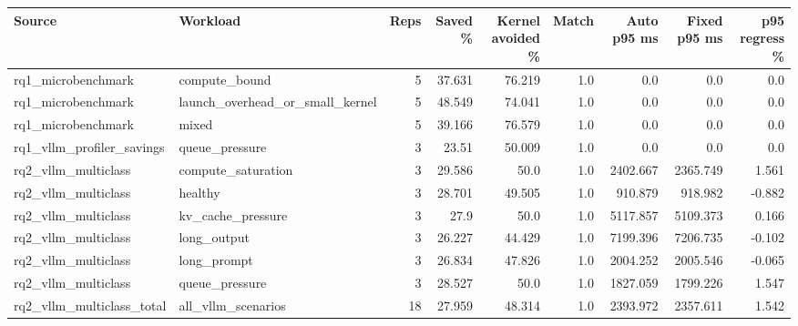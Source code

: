 \begin{tabular}{llrrrrrrr}
\hline
Source & Workload & Reps & Saved \% & Kernel avoided \% & Match & Auto p95 ms & Fixed p95 ms & p95 regress \% \\
\hline
rq1_microbenchmark & compute_bound & 5 & 37.631 & 76.219 & 1.0 & 0.0 & 0.0 & 0.0 \\
rq1_microbenchmark & launch_overhead_or_small_kernel & 5 & 48.549 & 74.041 & 1.0 & 0.0 & 0.0 & 0.0 \\
rq1_microbenchmark & mixed & 5 & 39.166 & 76.579 & 1.0 & 0.0 & 0.0 & 0.0 \\
rq1_vllm_profiler_savings & queue_pressure & 3 & 23.51 & 50.009 & 1.0 & 0.0 & 0.0 & 0.0 \\
rq2_vllm_multiclass & compute_saturation & 3 & 29.586 & 50.0 & 1.0 & 2402.667 & 2365.749 & 1.561 \\
rq2_vllm_multiclass & healthy & 3 & 28.701 & 49.505 & 1.0 & 910.879 & 918.982 & -0.882 \\
rq2_vllm_multiclass & kv_cache_pressure & 3 & 27.9 & 50.0 & 1.0 & 5117.857 & 5109.373 & 0.166 \\
rq2_vllm_multiclass & long_output & 3 & 26.227 & 44.429 & 1.0 & 7199.396 & 7206.735 & -0.102 \\
rq2_vllm_multiclass & long_prompt & 3 & 26.834 & 47.826 & 1.0 & 2004.252 & 2005.546 & -0.065 \\
rq2_vllm_multiclass & queue_pressure & 3 & 28.527 & 50.0 & 1.0 & 1827.059 & 1799.226 & 1.547 \\
rq2_vllm_multiclass_total & all_vllm_scenarios & 18 & 27.959 & 48.314 & 1.0 & 2393.972 & 2357.611 & 1.542 \\
\hline
\end{tabular}
